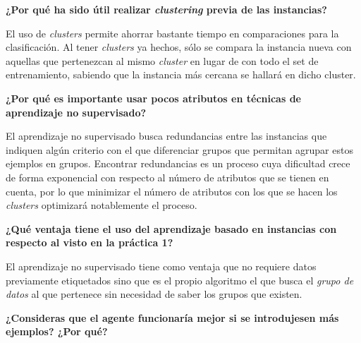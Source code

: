 \documentclass[12pt]{article}
\begin{document}
\newpage

\vspace{0.5cm}
\begin{center}
    \textbf{¿Por qué ha sido útil realizar \textit{clustering} previa de las instancias?}
\end{center}
\vspace{0.5cm}


El uso de \textit{clusters} permite ahorrar bastante tiempo en comparaciones para la clasificación. Al tener \textit{clusters} ya hechos, sólo se compara la instancia nueva con aquellas que pertenezcan al mismo \textit{cluster} en lugar de con todo el set de entrenamiento, sabiendo que la instancia más cercana se hallará en dicho cluster.

\vspace{0.5cm}
\begin{center}
    \textbf{¿Por qué es importante usar pocos atributos en técnicas de aprendizaje no supervisado?}
\end{center}
\vspace{0.5cm}

El aprendizaje no supervisado busca redundancias entre las instancias que indiquen algún criterio con el que diferenciar grupos que permitan agrupar estos ejemplos en grupos. Encontrar redundancias es un proceso cuya dificultad crece de forma exponencial con respecto al número de atributos que se tienen en cuenta, por lo que minimizar el número de atributos con los que se hacen los \textit{clusters} optimizará notablemente el proceso.

\vspace{0.5cm}
\begin{center}
    \textbf{¿Qué ventaja tiene el uso del aprendizaje basado en instancias con respecto al visto en la práctica 1?}
\end{center}
\vspace{0.5cm}

El aprendizaje no supervisado tiene como ventaja que no requiere datos previamente etiquetados sino que es el propio algoritmo el que busca el \textit{grupo de datos} al que pertenece sin necesidad de saber los grupos que existen.

\vspace{0.5cm}
\begin{center}
    \textbf{¿Consideras que el agente funcionaría mejor si se introdujesen más ejemplos? ¿Por qué?}
\end{center}
\vspace{0.5cm}
\end{document}
